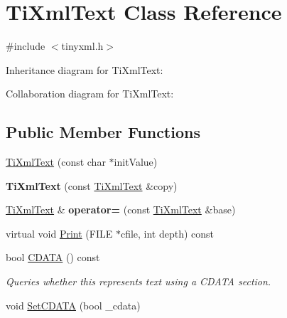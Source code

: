 \hypertarget{class_ti_xml_text}{
\section{\-Ti\-Xml\-Text \-Class \-Reference}
\label{class_ti_xml_text}
}


{\ttfamily \#include $<$tinyxml.\-h$>$}



\-Inheritance diagram for \-Ti\-Xml\-Text\-:


\-Collaboration diagram for \-Ti\-Xml\-Text\-:
\subsection*{\-Public \-Member \-Functions}
\begin{DoxyCompactItemize}
\item 
\hyperlink{class_ti_xml_text_af659e77c6b87d684827f35a8f4895960}{\-Ti\-Xml\-Text} (const char $\ast$init\-Value)
\item 
\hypertarget{class_ti_xml_text_a8d2cc1b4af2208cbb0171cf20f6815d1}{
{\bfseries \-Ti\-Xml\-Text} (const \hyperlink{class_ti_xml_text}{\-Ti\-Xml\-Text} \&copy)}
\label{class_ti_xml_text_a8d2cc1b4af2208cbb0171cf20f6815d1}

\item 
\hypertarget{class_ti_xml_text_aed5b13f9c1b804c616fd533882c29f57}{
\hyperlink{class_ti_xml_text}{\-Ti\-Xml\-Text} \& {\bfseries operator=} (const \hyperlink{class_ti_xml_text}{\-Ti\-Xml\-Text} \&base)}
\label{class_ti_xml_text_aed5b13f9c1b804c616fd533882c29f57}

\item 
virtual void \hyperlink{class_ti_xml_text_ae74d56c5b3ddec6cc3103dd51821af92}{\-Print} (\-F\-I\-L\-E $\ast$cfile, int depth) const 
\item 
\hypertarget{class_ti_xml_text_ad1a6a6b83fa2271022dd97c072a2b586}{
bool \hyperlink{class_ti_xml_text_ad1a6a6b83fa2271022dd97c072a2b586}{\-C\-D\-A\-T\-A} () const }
\label{class_ti_xml_text_ad1a6a6b83fa2271022dd97c072a2b586}

\begin{DoxyCompactList}\small\item\em \-Queries whether this represents text using a \-C\-D\-A\-T\-A section. \end{DoxyCompactList}\item 
\hypertarget{class_ti_xml_text_acb17ff7c5d09b2c839393445a3de5ea9}{
void \hyperlink{class_ti_xml_text_acb17ff7c5d09b2c839393445a3de5ea9}{\-Set\-C\-D\-A\-T\-A} (bool \-\_\-cdata)}
\label{class_ti_xml_text_acb17ff7c5d09b2c839393445a3de5ea9}


\end{DoxyCompactItemize}
